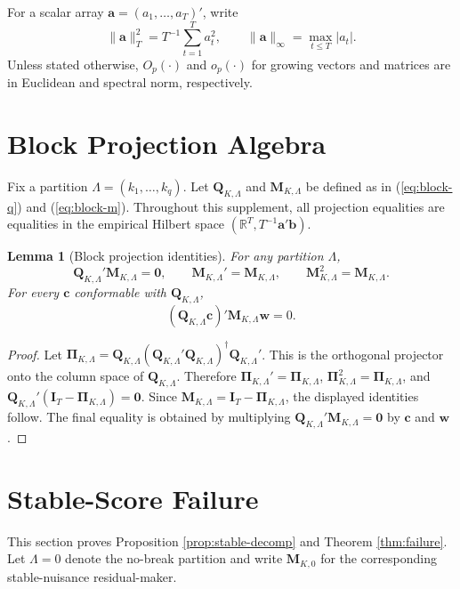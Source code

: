 \documentclass[10pt]{book}
\numberwithin{equation}{section}
\newtheorem{lemma}{Lemma}
\theoremstyle{definition}
\newcommand{\R}{\mathbb R}
\begin{document}
For a scalar array \(\bm a=(a_1,\ldots,a_T)'\), write
\[
    \|\bm a\|_T^2
    =
    T^{-1}\sum_{t=1}^T a_t^2,
    \qquad
    \|\bm a\|_\infty=\max_{t\leq T}|a_t|.
\]
Unless stated otherwise, \(O_p(\cdot)\) and \(o_p(\cdot)\) for growing
vectors and matrices are in Euclidean and spectral norm, respectively.

\section{Block Projection Algebra}

Fix a partition \(\Lambda=(k_1,\ldots,k_q)\). Let \(\bm Q_{K,\Lambda}\) and \(\bm M_{K,\Lambda}\) be defined as in (\ref*{eq:block-q}) and (\ref*{eq:block-m}). Throughout this supplement, all projection equalities are equalities in the empirical Hilbert space \((\R^T,T^{-1}\bm a'\bm b)\).

\begin{lemma}[Block projection identities]
\label{lem:s-block-identities}
For any partition \(\Lambda\),
\[
    \bm Q_{K,\Lambda}'\bm M_{K,\Lambda}=\bm0,
    \qquad
    \bm M_{K,\Lambda}'=\bm M_{K,\Lambda},
    \qquad
    \bm M_{K,\Lambda}^2=\bm M_{K,\Lambda}.
\]
For every \(\bm c\) conformable with \(\bm Q_{K,\Lambda}\),
\[
    (\bm Q_{K,\Lambda}\bm c)'\bm M_{K,\Lambda}\bm w=0.
\]
\end{lemma}

\begin{proof}
Let \(\bm\Pi_{K,\Lambda}=\bm Q_{K,\Lambda}(\bm Q_{K,\Lambda}'\bm Q_{K,\Lambda})^\dagger\bm Q_{K,\Lambda}'\). This is the orthogonal projector onto the column space of \(\bm Q_{K,\Lambda}\). Therefore \(\bm\Pi_{K,\Lambda}'=\bm\Pi_{K,\Lambda}\), \(\bm\Pi_{K,\Lambda}^2=\bm\Pi_{K,\Lambda}\), and \(\bm Q_{K,\Lambda}'(\bm I_T-\bm\Pi_{K,\Lambda})=\bm0\). Since \(\bm M_{K,\Lambda}=\bm I_T-\bm\Pi_{K,\Lambda}\), the displayed identities follow. The final equality is obtained by multiplying \(\bm Q_{K,\Lambda}'\bm M_{K,\Lambda}=\bm0\) by \(\bm c\) and \(\bm w\).
\end{proof}

\section{Stable-Score Failure}

This section proves Proposition \ref*{prop:stable-decomp} and Theorem \ref*{thm:failure}. Let \(\Lambda=0\) denote the no-break partition and write \(\bm M_{K,0}\) for the corresponding stable-nuisance residual-maker.
\end{document}

